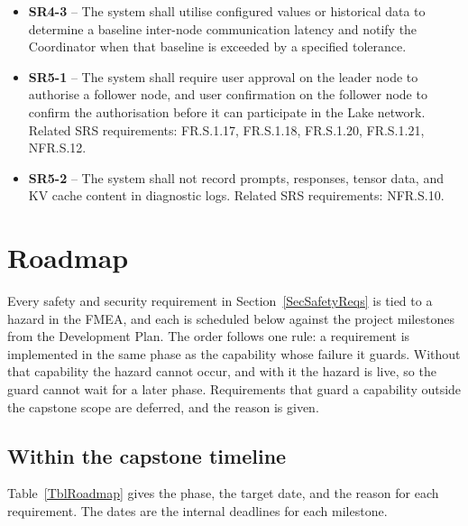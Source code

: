\documentclass{article}
\begin{document}
\begin{itemize}
    \item \label{SR4-3}\textbf{SR4-3} -- The system shall utilise configured values or historical data to determine a baseline inter-node communication latency and notify the Coordinator when that baseline is exceeded by a specified tolerance.
    \item \label{SR5-1}\textbf{SR5-1} -- The system shall require user approval on the leader node to authorise a follower node, and user confirmation on the follower node to confirm the authorisation before it can participate in the Lake network. Related SRS requirements: FR.S.1.17, FR.S.1.18, FR.S.1.20, FR.S.1.21, NFR.S.12.
    \item \label{SR5-2}\textbf{SR5-2} -- The system shall not record prompts, responses, tensor data, and KV cache content in diagnostic logs. Related SRS requirements: NFR.S.10.
\end{itemize}

\section{Roadmap}
\label{SecRoadmap}

Every safety and security requirement in Section~\ref{SecSafetyReqs} is tied
to a hazard in the FMEA, and each is scheduled below against the project
milestones from the Development Plan. The order follows one rule: a
requirement is implemented in the same phase as the capability whose failure
it guards. Without that capability the hazard cannot occur, and with it the
hazard is live, so the guard cannot wait for a later phase. Requirements
that guard a capability outside the capstone scope are deferred, and the
reason is given.

\subsection{Within the capstone timeline}

Table~\ref{TblRoadmap} gives the phase, the target date, and the reason for
each requirement. The dates are the internal deadlines for each milestone.
\end{document}
